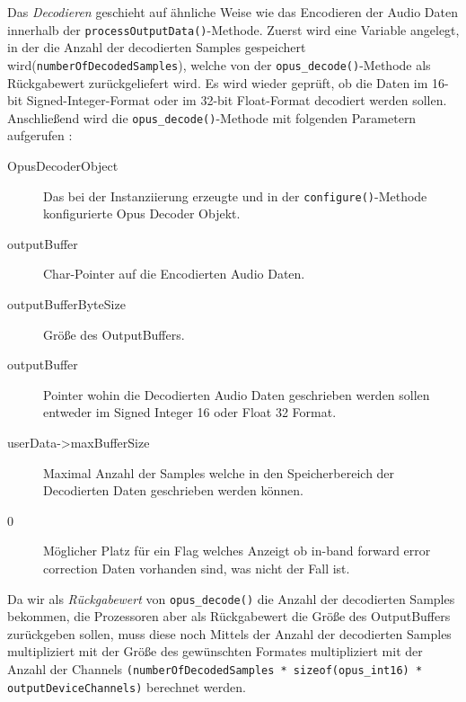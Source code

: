 Das \textit{Decodieren} geschieht auf ähnliche Weise wie das Encodieren der Audio Daten innerhalb der \texttt{processOutputData()}-Methode.
Zuerst wird eine Variable angelegt, in der die Anzahl der decodierten Samples gespeichert wird(\texttt{numberOfDecodedSamples}), welche von der \texttt{opus\_decode()}-Methode als Rückgabewert zurückgeliefert wird. Es wird wieder geprüft, ob die Daten im 16-bit Signed-Integer-Format oder im 32-bit Float-Format decodiert werden sollen. Anschließend wird die \texttt{opus\_decode()}-Methode mit folgenden Parametern aufgerufen :

\begin{description}
\item[OpusDecoderObject] Das bei der Instanziierung erzeugte und in der \texttt{configure()}-Methode konfigurierte Opus Decoder Objekt.
\item[outputBuffer] Char-Pointer auf die Encodierten Audio Daten.
\item[outputBufferByteSize] Größe des OutputBuffers.
\item[outputBuffer] Pointer wohin die Decodierten Audio Daten geschrieben werden sollen entweder im Signed Integer 16 oder Float 32 Format.
\item[userData->maxBufferSize] Maximal Anzahl der Samples welche in den Speicherbereich der Decodierten Daten geschrieben werden können.
\item[0] Möglicher Platz für ein Flag welches Anzeigt ob in-band forward error correction Daten vorhanden sind, was nicht der Fall ist.
\end{description}

Da wir als \textit{Rückgabewert} von \texttt{opus\_decode()} die Anzahl der decodierten Samples bekommen, die Prozessoren aber als Rückgabewert die Größe des OutputBuffers zurückgeben sollen, muss diese noch Mittels der Anzahl der decodierten Samples multipliziert mit der Größe des gewünschten Formates multipliziert mit der Anzahl der Channels \texttt{(numberOfDecodedSamples * sizeof(opus\_int16) * outputDeviceChannels)} berechnet werden.

